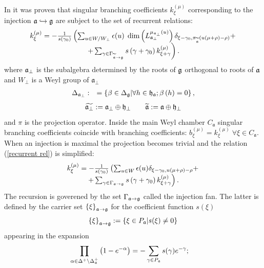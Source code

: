 \documentclass[12pt]{article}
\begin{document}
In \cite{2010arXiv1007.0318L} it was proven that singular branching coefficients $k_{\xi }^{\left( \mu \right) }$ corresponding to the injection $\frak{a}%
\hookrightarrow \frak{g}$ are subject to the set of recurrent relations:
\begin{equation}
\begin{array}{c}
k_{\xi }^{\left( \mu \right) }=-\frac{1}{s\left( \gamma _{0}\right) }\left(
\sum_{u\in W/W_{\perp}}\epsilon (u)\;\dim \left( L_{\frak{a}_{\perp }}^{\mu _{\frak{a}%
_{\perp }}\left( u\right) }\right) \delta _{\xi -\gamma _{0},\pi _{%
\widetilde{\frak{a}}}(u(\mu +\rho )-\rho )}+\right. \\
\left. +\sum_{\gamma \in \Gamma _{\widetilde{\frak{a}}\rightarrow \frak{g}%
}}s\left( \gamma +\gamma _{0}\right) k_{\xi +\gamma }^{\left( \mu \right)
}\right) .
\end{array}
\label{recurrent rel}
\end{equation}
where $\frak{a}_{\perp }$ is the subalgebra determined by the roots of $%
\frak{g}$ orthogonal to roots of $\frak{a}$ and $W_{\perp}$ is a Weyl group of $\mathfrak{a}_{\perp}$
\begin{eqnarray}
\Delta _{\frak{a}_{\perp }} &:&=\left\{ \beta \in \Delta _{\frak{g}}|\forall
h\in \frak{h}_{\frak{a}};\beta \left( h\right) =0\right\} ,
\label{delta a ort}
\end{eqnarray}
\begin{eqnarray}
\widetilde{\frak{a}_{\perp }} :=\frak{a}_{\perp }\oplus \frak{h}_{\perp }
\qquad \widetilde{\frak{a}} :=\frak{a}\oplus \frak{h}_{\perp }
\end{eqnarray}
and $\pi$ is the projection operator. Inside the main Weyl chamber $C_{\mathfrak{a}}$ singular branching coefficients coincide with branching coefficients: $ b_{\xi }^{\left( \mu \right) }=k_{\xi }^{\left( \mu \right) }\; \forall \xi\in C_{\mathfrak{a}}$. When an injection is maximal the
projection becomes trivial and the relation (\ref{recurrent rel}) is
simplified:
\begin{equation}
\begin{array}{c}
k_{\xi }^{\left( \mu \right) }=-\frac{1}{s\left( \gamma _{0}\right) }\left(
\sum_{u\in W}\epsilon (u) \delta _{\xi -\gamma _{0}, u(\mu +\rho )-\rho
}+\right. \\
\left. +\sum_{\gamma \in \Gamma _{\frak{a}\rightarrow \frak{g}}}s\left(
\gamma +\gamma _{0}\right) k_{\xi +\gamma }^{\left( \mu \right) }\right) .
\end{array}
\label{recurrent relation max}
\end{equation}
The recursion is goverened by the set $\Gamma _{\frak{a}\rightarrow \frak{g}}
$ called the injection fan. The latter is defined by the carrier set $%
\left\{ \xi \right\} _{\frak{a}\rightarrow \frak{g}}$ for the coefficient
function $s(\xi )$
\[
\left\{ \xi \right\} _{\frak{a}\rightarrow \frak{g}}:=\left\{ \xi \in P_{%
\frak{a}}|s(\xi )\neq 0\right\}
\]
appearing in the expansion
\begin{equation}
\prod_{\alpha \in \Delta ^{+}\setminus \Delta _{\frak{a}}^{+}}\left( 1-e^{
-\alpha }\right) =-\sum_{\gamma \in P_{\frak{a}}}s(\gamma )e^{-\gamma };\quad
\label{product}
\end{equation}
\end{document}

